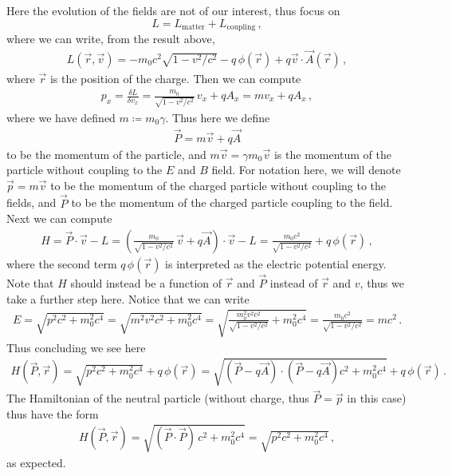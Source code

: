 \documentclass[11pt, onesided]{book}
\theoremstyle{break}
\theoremstyle{break}
\begin{document}
Here the evolution of the fields are not of our interest, thus focus on $$L = L_{\text{matter}} + L_{\text{coupling}}\,,$$ 
where we can write, from the result above,
\begin{align}
L(\vec{r}, \vec{v}) = -m_0 c^2 \sqrt{1 - v^2/c^2} - q\, \phi(\vec{r}) + q\vec{v}\cdot \vec{A}(\vec{r})\,,
\end{align}
where $\vec{r}$ is the position of the charge. Then we can compute
\begin{align*}
p_x = \frac{\delta L}{\delta v_x} = \frac{m_0}{\sqrt{1 - v^2/c^2}}\, v_x + qA_x = mv_x + qA_x\,,
\end{align*}
where we have defined $m \coloneqq m_0 \gamma$. Thus here we define
\begin{align*}
\vec{P} = m\vec{v} + q\vec{A}
\end{align*}
to be the momentum of the particle, and $m\vec{v}=\gamma m_0 \vec{v}$ is the momentum of the particle without coupling to the $E$ and $B$ field. For notation here, we will denote $\vec{p} = m \vec{v}$ to be the momentum of the charged particle without coupling to the fields, and $\vec{P}$ to be the momentum of the charged particle coupling to the field. \\

Next we can compute
\begin{align*}
H = \vec{P}\cdot \vec{v} - L = \left(\frac{m_0}{\sqrt{1-v^2/c^2}}\,\vec{v} + q\vec{A}\right) \cdot \vec{v} - L = \frac{m_0c^2}{\sqrt{1 - v^2/c^2}} + q\, \phi(\vec{r})\,,
\end{align*}
where the second term $q \,\phi(\vec{r})$ is interpreted as the electric potential energy. Note that $H$ should instead be a function of $\vec{r}$ and $\vec{P}$ instead of $\vec{r}$ and $v$, thus we take a further step here. Notice that we can write
\begin{align*}
E = \sqrt{p^2 c^2 + m_0^2 c^4} = 
\sqrt{m^2 v^2 c^2 + m_0^2 c^4} = \sqrt{\frac{m_0^2v^2c^2}{\sqrt{1-v^2/c^2}} +m_0^2c^4} = \frac{m_0c^2}{\sqrt{1-v^2/c^2}} = mc^2\,.
\end{align*}
Thus concluding we see here
\begin{align*}
H(\vec{P}, \vec{r}) = \sqrt{p^2c^2 + m_0^2 c^4} + q\, \phi(\vec{r}) = \sqrt{(\vec{P}-q\vec{A})\cdot(\vec{P}-q\vec{A}) c^2 + m_0^2 c^4} + q\, \phi(\vec{r}) \,.
\end{align*}
The Hamiltonian of the neutral particle (without charge, thus $\vec{P} = \vec{p}$ in this case) thus have the form
\begin{align*}
H(\vec{P}, \vec{r}) = \sqrt{(\vec{P}\cdot \vec{P})\, c^2 + m_0^2 c^4} = \sqrt{p^2 c^2 + m_0^2 c^4} \,,
\end{align*}
as expected. \\
\end{document}
